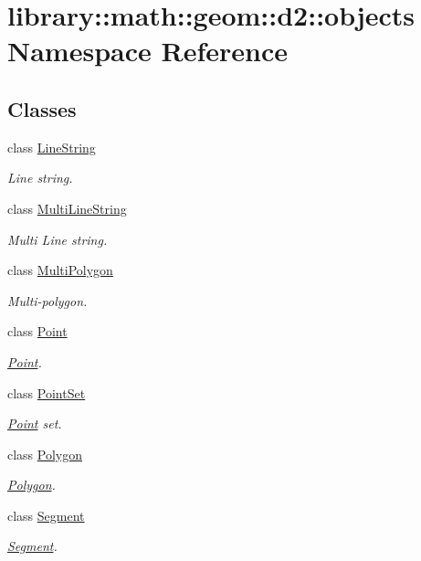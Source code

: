 \hypertarget{namespacelibrary_1_1math_1_1geom_1_1d2_1_1objects}{}\section{library\+:\+:math\+:\+:geom\+:\+:d2\+:\+:objects Namespace Reference}
\label{namespacelibrary_1_1math_1_1geom_1_1d2_1_1objects}
\subsection*{Classes}
\begin{DoxyCompactItemize}
\item 
class \hyperlink{classlibrary_1_1math_1_1geom_1_1d2_1_1objects_1_1_line_string}{Line\+String}
\begin{DoxyCompactList}\small\item\em Line string. \end{DoxyCompactList}\item 
class \hyperlink{classlibrary_1_1math_1_1geom_1_1d2_1_1objects_1_1_multi_line_string}{Multi\+Line\+String}
\begin{DoxyCompactList}\small\item\em Multi Line string. \end{DoxyCompactList}\item 
class \hyperlink{classlibrary_1_1math_1_1geom_1_1d2_1_1objects_1_1_multi_polygon}{Multi\+Polygon}
\begin{DoxyCompactList}\small\item\em Multi-\/polygon. \end{DoxyCompactList}\item 
class \hyperlink{classlibrary_1_1math_1_1geom_1_1d2_1_1objects_1_1_point}{Point}
\begin{DoxyCompactList}\small\item\em \hyperlink{classlibrary_1_1math_1_1geom_1_1d2_1_1objects_1_1_point}{Point}. \end{DoxyCompactList}\item 
class \hyperlink{classlibrary_1_1math_1_1geom_1_1d2_1_1objects_1_1_point_set}{Point\+Set}
\begin{DoxyCompactList}\small\item\em \hyperlink{classlibrary_1_1math_1_1geom_1_1d2_1_1objects_1_1_point}{Point} set. \end{DoxyCompactList}\item 
class \hyperlink{classlibrary_1_1math_1_1geom_1_1d2_1_1objects_1_1_polygon}{Polygon}
\begin{DoxyCompactList}\small\item\em \hyperlink{classlibrary_1_1math_1_1geom_1_1d2_1_1objects_1_1_polygon}{Polygon}. \end{DoxyCompactList}\item 
class \hyperlink{classlibrary_1_1math_1_1geom_1_1d2_1_1objects_1_1_segment}{Segment}
\begin{DoxyCompactList}\small\item\em \hyperlink{classlibrary_1_1math_1_1geom_1_1d2_1_1objects_1_1_segment}{Segment}. \end{DoxyCompactList}\end{DoxyCompactItemize}

